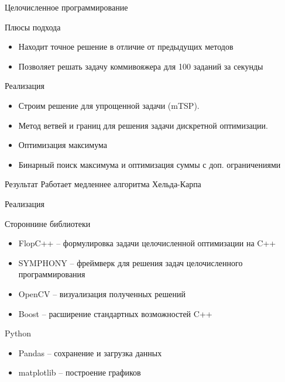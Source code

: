 \documentclass{beamer}
\begin{document}
\begin{frame}{Целочисленное программирование}
\begin{block}{Плюсы подхода}
    \begin{itemize}
        \item Находит точное решение в отличие от предыдущих методов
        \item Позволяет решать задачу коммивояжера для 100 заданий за секунды
    \end{itemize}
\end{block}

\begin{block}{Реализация}
    \begin{itemize}
        \item Строим решение для упрощенной задачи (mTSP).
        \item Метод ветвей и границ для решения задачи дискретной оптимизации.
        \item Оптимизация максимума
        \item Бинарный поиск максимума и оптимизация суммы с доп. ограничениями
    \end{itemize}

\end{block}

\begin{alertblock}{Результат}
Работает медленнее алгоритма Хельда-Карпа
\end{alertblock}

\end{frame}

\begin{frame}{Реализация}

Стороннине библиотеки
\begin{itemize}
\item FlopC++ -- формулировка задачи целочисленной оптимизации на C++
\item SYMPHONY -- фреймверк для решения задач целочисленного программирования
\item OpenCV -- визуализация полученных решений
\item Boost -- расширение стандартных возможностей C++
\end{itemize}

Python
\begin{itemize}
\item Pandas -- сохранение и загрузка данных
\item matplotlib -- построение графиков
\end{itemize}

\end{frame}
\end{document}
